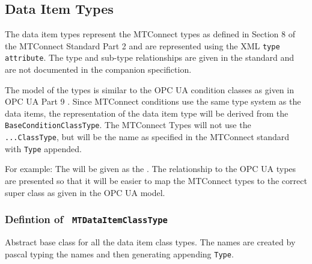 \subsection{Data Item Types} \label{model:DataItemTypes}

The data item types represent the MTConnect types as defined in Section 8 of the 
MTConnect Standard Part 2 \cite{MTCPart2} and are represented using the XML \texttt{type} 
\texttt{attribute}. The type and sub-type relationships are given in the standard and are 
not documented in the companion specifiction. 

The model of the types is similar to the OPC UA condition classes as given in OPC UA Part 9
\cite{UAPart9}. Since MTConnect conditions use the same type system as the data items, 
the representation of the data item type will be derived from the \texttt{BaseConditionClassType}. 
The MTConnect Types will not use the \texttt{...ClassType}, but will be the name as specified
in the MTConnect standard with \texttt{Type} appended.

For example: The  will be given as the . 
The relationship to the  OPC UA types are presented so that it will be
easier to map the MTConnect types to the correct super class as given in the OPC UA model.

\subsubsection{Defintion of \texttt{ MTDataItemClassType}}
  \label{type:MTDataItemClassType}

\FloatBarrier

Abstract base class for all the data item class types. The names are created by pascal typing the names
and then generating appending \texttt{Type}.

